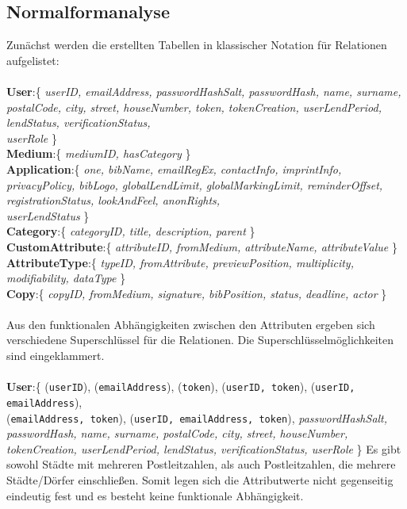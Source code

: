 \documentclass{article}
\begin{document}
\subsection{Normalformanalyse}
Zunächst werden die erstellten Tabellen in klassischer Notation für Relationen aufgelistet: \\
\\
\textbf{User}:\{ \textit{userID, emailAddress, passwordHashSalt, passwordHash, name, surname, postalCode, city, street, houseNumber, token, tokenCreation, userLendPeriod, lendStatus, verificationStatus,\\ userRole} \}\\
\textbf{Medium}:\{ \textit{mediumID, hasCategory} \}\\
\textbf{Application}:\{ \textit{one, bibName, emailRegEx, contactInfo, imprintInfo, privacyPolicy, bibLogo, globalLendLimit, globalMarkingLimit, reminderOffset, registrationStatus, lookAndFeel, anonRights,\\ userLendStatus} \}\\
\textbf{Category}:\{ \textit{categoryID, title, description, parent} \}\\
\textbf{CustomAttribute}:\{ \textit{attributeID, fromMedium, attributeName, attributeValue} \}\\
\textbf{AttributeType}:\{ \textit{typeID, fromAttribute, previewPosition, multiplicity, modifiability, dataType} \}\\
\textbf{Copy}:\{ \textit{copyID, fromMedium, signature, bibPosition, status, deadline, actor} \}\\
\\
Aus den funktionalen Abhängigkeiten zwischen den Attributen ergeben sich verschiedene Superschlüssel für die Relationen. Die Superschlüsselmöglichkeiten sind eingeklammert.\\
\\
\textbf{User}:\{ (\texttt{userID}), (\texttt{emailAddress}), (\texttt{token}), (\texttt{userID, token}), (\texttt{userID, emailAddress}), \\ (\texttt{emailAddress, token}), (\texttt{userID, emailAddress, token}), \textit{passwordHashSalt, passwordHash, name, surname, postalCode, city, street, houseNumber, tokenCreation, userLendPeriod, lendStatus, verificationStatus, userRole} \}
Es gibt sowohl Städte mit mehreren Postleitzahlen, als auch Postleitzahlen, die mehrere Städte/Dörfer einschließen. Somit legen sich die Attributwerte nicht gegenseitig eindeutig fest und es besteht keine funktionale Abhängigkeit.\\
\end{document}
